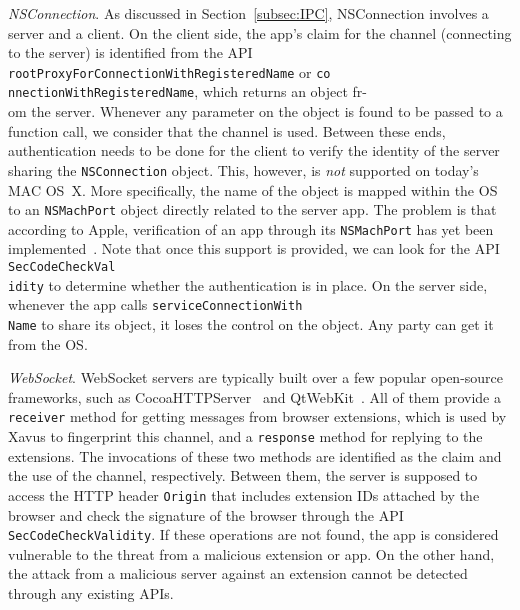 \documentclass{article}
\begin{document}
\vspace {3pt}\noindent\textit{ NSConnection}. As discussed in Section~\ref{subsec:IPC}, NSConnection involves a server and a client. On the client side, the app's claim for the channel (connecting to the server) is identified from the API \texttt{rootProxyForConnectionWithRegisteredName} or \texttt{co\\nnectionWithRegisteredName}, which returns an object fr-\\om the server. Whenever any parameter on the object is found to be passed to a function call, we consider that the channel is used.  Between these ends, authentication needs to be done for the client to verify the identity of the server sharing the \texttt{NSConnection} object.  This, however, is \textit{not} supported on today's MAC OS~X. More specifically, the name of the object is mapped within the OS to an \texttt{NSMachPort} object directly related to the server app.  The problem is that according to Apple, verification of an app through its \texttt{NSMachPort} has yet been implemented~\cite{machnotimp}. Note that once this support is provided, we can look for the API \texttt{SecCodeCheckVal\\idity} to determine whether the authentication is in place. On the server side, whenever the app calls \texttt{serviceConnectionWith\\Name} to share its object, it loses the control on the object. Any party can get it from the OS.



\vspace {3pt}\noindent\textit{ WebSocket}. WebSocket servers are typically built over a few popular open-source frameworks, such as CocoaHTTPServer~\cite{CocoaHTTPServer} and QtWebKit~\cite{QtWebKit}. All of them provide a \texttt{receiver} method for getting messages from browser extensions, which is used by Xavus to fingerprint this channel, and a \texttt{response} method for replying to the extensions. The invocations of these two methods are identified as the claim and the use of the channel, respectively. Between them, the server is supposed to access the HTTP header \texttt{Origin} that includes extension IDs attached by the browser and check the signature of the browser through the API \texttt{SecCodeCheckValidity}. If these operations are not found, the app is considered vulnerable to the threat from a malicious extension or app.  On the other hand, the attack from a malicious server against an extension cannot be detected through any existing APIs.
\end{document}
